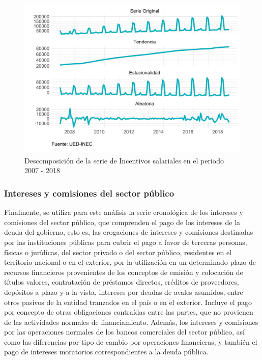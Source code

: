 \documentclass[
]{article}
\begin{document}
\begin{figure}[!h]
\includegraphics[width=1\linewidth,height=1\textheight]{Tesis_files/figure-latex/incentivosplotdescomposicion-1} \caption{Descomposición de la serie de Incentivos salariales en el periodo 2007 - 2018}\label{fig:incentivosplotdescomposicion}
\end{figure}

\subsubsection{Intereses y comisiones del sector público}

Finalmente, se utiliza para este análisis la serie cronológica de los
intereses y comisiones del sector público, que comprenden el pago de los
intereses de la deuda del gobierno, esto es, las erogaciones de
intereses y comisiones destinadas por las instituciones públicas para
cubrir el pago a favor de terceras personas, físicas o jurídicas, del
sector privado o del sector público, residentes en el territorio
nacional o en el exterior, por la utilización en un determinado plazo de
recursos financieros provenientes de los conceptos de emisión y
colocación de títulos valores, contratación de préstamos directos,
créditos de proveedores, depósitos a plazo y a la vista, intereses por
deudas de avales asumidos, entre otros pasivos de la entidad tranzados
en el país o en el exterior. Incluye el pago por concepto de otras
obligaciones contraídas entre las partes, que no provienen de las
actividades normales de financiamiento. Además, los intereses y
comisiones por las operaciones normales de los bancos comerciales del
sector público, así como las diferencias por tipo de cambio por
operaciones financieras; y también el pago de intereses moratorios
correspondientes a la deuda pública.
\end{document}
